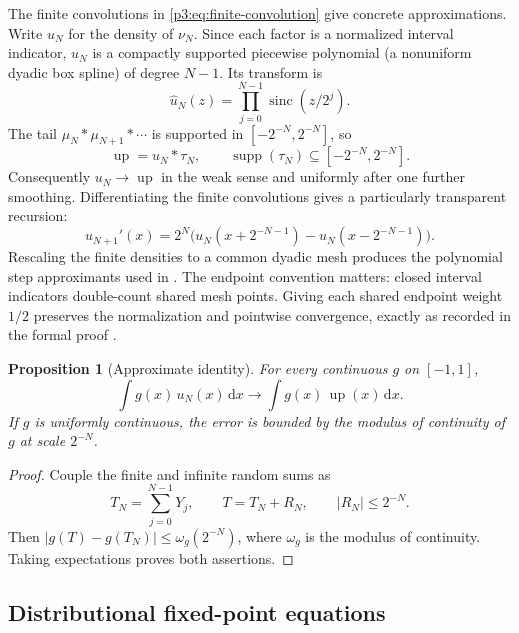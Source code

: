 \documentclass[11pt]{article}
\numberwithin{equation}{section}
\newtheorem{proposition}[theorem]{Proposition}
\theoremstyle{definition}
\theoremstyle{remark}
\DeclareMathOperator{\supp}{supp}
\newcommand{\upf}{\operatorname{up}}
\newcommand{\sinc}{\operatorname{sinc}}
\newcommand{\dd}{\,\mathrm d}
\begin{document}
The finite convolutions in \eqref{p3:eq:finite-convolution} give concrete approximations.  Write $u_N$ for the density of $\nu_N$.  Since each factor is a normalized interval indicator, $u_N$ is a compactly supported piecewise polynomial (a nonuniform dyadic box spline) of degree $N-1$.  Its transform is
\begin{equation}\label{p3:eq:uN-transform}
 \widehat u_N(z)=\prod_{j=0}^{N-1}\sinc(z/2^j).
\end{equation}
The tail $\mu_N*\mu_{N+1}*\cdots$ is supported in $[-2^{-N},2^{-N}]$, so
\begin{equation}\label{p3:eq:tail-convolution}
 \upf=u_N*\tau_N,
 \qquad \supp(\tau_N)\subseteq[-2^{-N},2^{-N}].
\end{equation}
Consequently $u_N\to\upf$ in the weak sense and uniformly after one further smoothing.  Differentiating the finite convolutions gives a particularly transparent recursion:
\begin{equation}\label{p3:eq:uN-derivative}
 u_{N+1}'(x)=2^N\bigl(u_N(x+2^{-N-1})-u_N(x-2^{-N-1})\bigr).
\end{equation}
Rescaling the finite densities to a common dyadic mesh produces the polynomial step approximants used in \cite{p3:Arias05442}.  The endpoint convention matters: closed interval indicators double-count shared mesh points.  Giving each shared endpoint weight $1/2$ preserves the normalization and pointwise convergence, exactly as recorded in the formal proof \cite{p3:ProveIt}.

\begin{proposition}[Approximate identity]\label{p3:prop:approximate-identity}
For every continuous $g$ on $[-1,1]$,
\begin{equation}\label{p3:eq:approx-identity}
 \int g(x)\,u_N(x)\dd x\longrightarrow\int g(x)\,\upf(x)\dd x.
\end{equation}
If $g$ is uniformly continuous, the error is bounded by the modulus of continuity of $g$ at scale $2^{-N}$.
\end{proposition}

\begin{proof}
Couple the finite and infinite random sums as
\[
 T_N=\sum_{j=0}^{N-1}Y_j,
 \qquad T=T_N+R_N,
 \qquad |R_N|\le2^{-N}.
\]
Then $|g(T)-g(T_N)|\le\omega_g(2^{-N})$, where $\omega_g$ is the modulus of continuity.  Taking expectations proves both assertions.
\end{proof}

\subsection{Distributional fixed-point equations}
\end{document}
